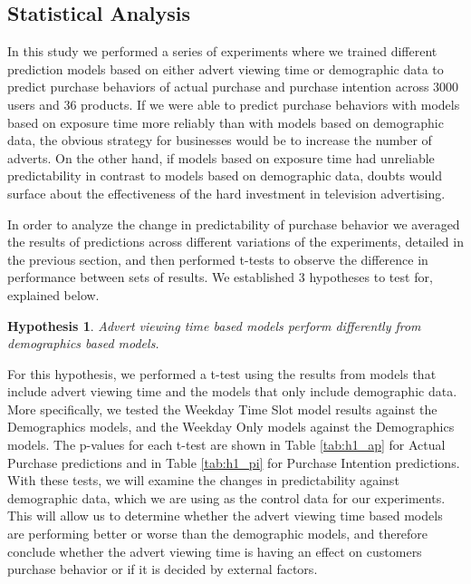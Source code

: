 \documentclass[review]{elsarticle}
\newtheorem{hyp}{Hypothesis}
\begin{document}
\subsection{Statistical Analysis}
\label{h_res}


In this study we performed a series of experiments where we trained different prediction models based on either advert viewing time or demographic data to predict purchase behaviors of actual purchase and purchase intention across 3000 users and 36 products. If we were able to predict purchase behaviors with models based on exposure time more reliably than with models based on demographic data, the obvious strategy for businesses would be to increase the number of adverts. On the other hand, if models based on exposure time had unreliable predictability in contrast to models based on demographic data, doubts would surface about the effectiveness of the hard investment in television advertising. 

In order to analyze the change in predictability of purchase behavior we averaged the results of predictions across different variations of the experiments, detailed in the previous section, and then performed t-tests to observe the difference in performance between sets of results. We established 3 hypotheses to test for, explained below.

\begin{hyp}
\label{hyp:1}
Advert viewing time based models perform differently from demographics based models.
\end{hyp}

For this hypothesis, we performed a t-test using the results from models that include advert viewing time and the models that only include demographic data. More specifically, we tested the Weekday Time Slot model results against the Demographics models, and the Weekday Only models against the Demographics models. The p-values for each t-test are shown in Table \ref{tab:h1_ap} for Actual Purchase predictions and in Table \ref{tab:h1_pi} for Purchase Intention predictions. With these tests, we will examine the changes in predictability against demographic data, which we are using as the control data for our experiments. This will allow us to determine whether the advert viewing time based models are performing better or worse than the demographic models, and therefore conclude whether the advert viewing time is having an effect on customers purchase behavior or if it is decided by external factors.
\end{document}
